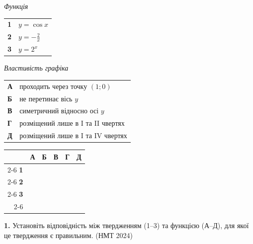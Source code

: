 \documentclass[14pt]{extarticle}
\newcommand{\answerGrid}{
    \begingroup
    \setlength{\tabcolsep}{4pt}
    \renewcommand{\arraystretch}{1.2}
    \small
    \begin{tabular}{r|c|c|c|c|c|}
         \multicolumn{1}{c}{} & \multicolumn{1}{c}{\textbf{А}} & \multicolumn{1}{c}{\textbf{Б}} & \multicolumn{1}{c}{\textbf{В}} & \multicolumn{1}{c}{\textbf{Г}} & \multicolumn{1}{c}{\textbf{Д}} \\ \cline{2-6}
         \textbf{1} & & & & & \\ \cline{2-6}
         \textbf{2} & & & & & \\ \cline{2-6}
         \textbf{3} & & & & & \\ \cline{2-6}
    \end{tabular}
    \endgroup
}
\newcommand{\nmtyear}[1]{\hfill{\small\color{yearcolor}(НМТ #1)}}
\begin{document}
\noindent
\begin{minipage}[t]{0.45\textwidth}
    \textit{Функція} \par \vspace{0.2cm}
    \begin{tabular}{@{}p{0.5cm} l@{}}
    \textbf{1} & $y = \cos x$ \\[0.4cm]
    \textbf{2} & $y = -\displaystyle\frac{2}{x}$ \\[0.6cm]
    \textbf{3} & \colorbox{yellow!30}{$y = 2^x$} \\
    \end{tabular}
\end{minipage}%
\hfill
\begin{minipage}[t]{0.50\textwidth}
    \textit{Властивість графіка} \par \vspace{0.2cm}
    \begin{tabular}{@{}p{0.5cm} p{7cm}@{}}
    \textbf{А} & проходить через точку $(1; 0)$ \\[0.2cm]
    \textbf{Б} & не перетинає вісь $y$ \\[0.2cm]
    \textbf{В} & симетричний відносно осі $y$ \\[0.2cm]
    \textbf{Г} & розміщений лише в I та II чвертях \\[0.2cm]
    \textbf{Д} & розміщений лише в I та IV чвертях \\
    \end{tabular}
\end{minipage}
\vspace{0.3cm}

\answerGrid

\noindent\textbf{1.} Установіть відповідність між твердженням (1–3) та функцією (А–Д), для якої це твердження є правильним. \nmtyear{2024}
\vspace{0.3cm}
\end{document}

